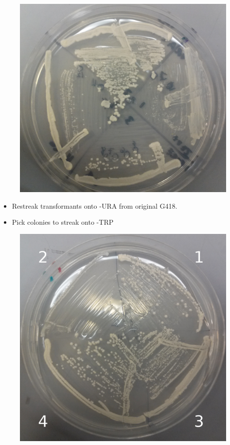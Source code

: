\documentclass{beamer}
\begin{document}
\begin{frame}
   \begin{minipage}[ht!]{.48\textwidth}
          \begin{figure}[ht!]
            \centering
            \includegraphics[width=.9\textwidth]{URArestreak1126.png}
            \label{fig:pcr}
        \end{figure}
    \end{minipage}
    \hfill
    \begin{minipage}[ht!]{.48\textwidth}
        \begin{itemize}
            \item<1-> Restreak transformants onto -URA from original G418.
            \item<2> Pick colonies to streak onto -TRP
        \end{itemize}
    \end{minipage}
\pause
 \begin{minipage}[ht!]{.48\textwidth}
          \begin{figure}[ht!]
            \centering
            \includegraphics[width=.9\textwidth]{TRPrestreak1205a.png}

\end{figure}
\end{minipage}
\end{frame}
\end{document}
